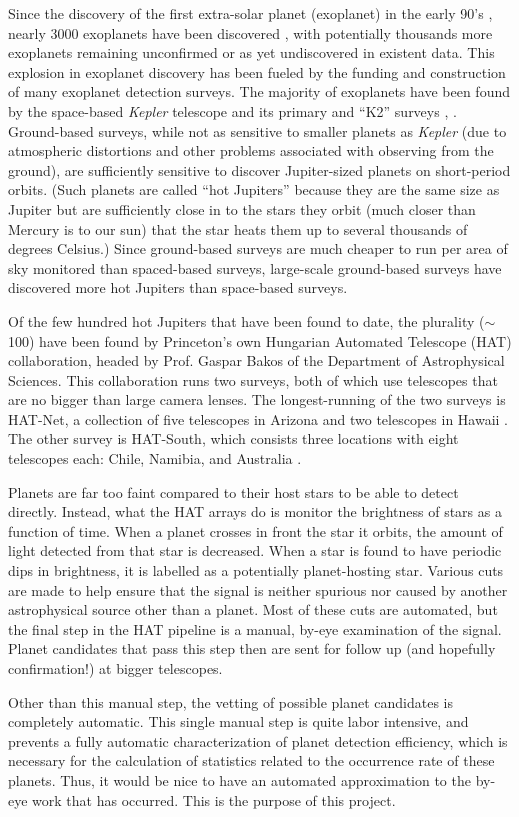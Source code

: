 Since the discovery of the first extra-solar planet (exoplanet) in the early 90's \cite{pulsarplanet}, nearly 3000 exoplanets have been discovered \cite{exoplanetorg}, with potentially thousands more exoplanets remaining unconfirmed or as yet undiscovered in existent data.  This explosion in exoplanet discovery has been fueled by the funding and construction of many exoplanet detection surveys.  The majority of exoplanets have been found by the space-based {\it Kepler} telescope and its primary and ``K2'' surveys \cite{kepler}, \cite{k2}.  Ground-based surveys, while not as sensitive to smaller planets as {\it Kepler} (due to atmospheric distortions and other problems associated with observing from the ground), are sufficiently sensitive to discover Jupiter-sized planets on short-period orbits.  (Such planets are called ``hot Jupiters'' because they are the same size as Jupiter but are sufficiently close in to the stars they orbit (much closer than Mercury is to our sun) that the star heats them up to several thousands of degrees Celsius.)  Since ground-based surveys are much cheaper to run per area of sky monitored than spaced-based surveys, large-scale ground-based surveys have discovered more hot Jupiters than space-based surveys.

Of the few hundred hot Jupiters that have been found to date, the plurality (${\sim}$100) have been found by Princeton's own Hungarian Automated Telescope (HAT) collaboration, headed by Prof. Gaspar Bakos of the Department of Astrophysical Sciences.  This collaboration runs two surveys, both of which use telescopes that are no bigger than large camera lenses.  The longest-running of the two surveys is HAT-Net, a collection of five telescopes in Arizona and two telescopes in Hawaii \cite{hatnet}.  The other survey is HAT-South, which consists three locations with eight telescopes each: Chile, Namibia, and Australia \cite{hatsouth}.

Planets are far too faint compared to their host stars to be able to detect directly.  Instead, what the HAT arrays do is monitor the brightness of stars as a function of time.  When a planet crosses in front the star it orbits, the amount of light detected from that star is decreased.  When a star is found to have periodic dips in brightness, it is labelled as a potentially planet-hosting star.  Various cuts are made to help ensure that the signal is neither spurious nor caused by another astrophysical source other than a planet.  Most of these cuts are automated, but the final step in the HAT pipeline is a manual, by-eye examination of the signal.  Planet candidates that pass this step then are sent for follow up (and hopefully confirmation!) at bigger telescopes.

Other than this manual step, the vetting of possible planet candidates is completely automatic.  This single manual step is quite labor intensive, and prevents a fully automatic characterization of planet detection efficiency, which is necessary for the calculation of statistics related to the occurrence rate of these planets.  Thus, it would be nice to have an automated approximation to the by-eye work that has occurred.  This is the purpose of this project.